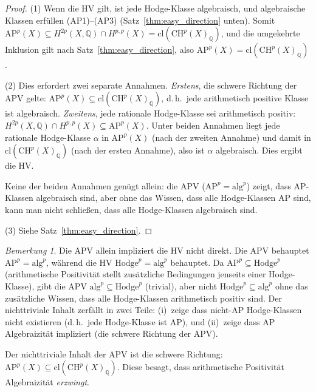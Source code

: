 \documentclass[aps,prd,twocolumn,superscriptaddress,nofootinbib]{revtex4-2}
\theoremstyle{definition}
\theoremstyle{remark}
\newtheorem{remark}[theorem]{Bemerkung}
\begin{document}
\begin{proof}
(1) Wenn die HV gilt, ist jede Hodge-Klasse algebraisch, und algebraische Klassen erfüllen (AP1)--(AP3) (Satz~\ref{thm:easy_direction} unten). Somit $\mathrm{AP}^p(X) \subseteq H^{2p}(X, \mathbb{Q}) \cap H^{p,p}(X) = \mathrm{cl}(\mathrm{CH}^p(X)_\mathbb{Q})$, und die umgekehrte Inklusion gilt nach Satz~\ref{thm:easy_direction}, also $\mathrm{AP}^p(X) = \mathrm{cl}(\mathrm{CH}^p(X)_\mathbb{Q})$.

(2) Dies erfordert zwei separate Annahmen. \textit{Erstens}, die schwere Richtung der APV gelte: $\mathrm{AP}^p(X) \subseteq \mathrm{cl}(\mathrm{CH}^p(X)_\mathbb{Q})$, d.\,h.\ jede arithmetisch positive Klasse ist algebraisch. \textit{Zweitens}, jede rationale Hodge-Klasse sei arithmetisch positiv: $H^{2p}(X, \mathbb{Q}) \cap H^{p,p}(X) \subseteq \mathrm{AP}^p(X)$. Unter beiden Annahmen liegt jede rationale Hodge-Klasse $\alpha$ in $\mathrm{AP}^p(X)$ (nach der zweiten Annahme) und damit in $\mathrm{cl}(\mathrm{CH}^p(X)_\mathbb{Q})$ (nach der ersten Annahme), also ist $\alpha$ algebraisch. Dies ergibt die HV.

Keine der beiden Annahmen genügt allein: die APV ($\mathrm{AP}^p = \mathrm{alg}^p$) zeigt, dass AP-Klassen algebraisch sind, aber ohne das Wissen, dass alle Hodge-Klassen AP sind, kann man nicht schließen, dass alle Hodge-Klassen algebraisch sind.

(3) Siehe Satz~\ref{thm:easy_direction}.
\end{proof}

\begin{remark}
Die APV allein impliziert die HV nicht direkt. Die APV behauptet $\mathrm{AP}^p = \mathrm{alg}^p$, während die HV $\mathrm{Hodge}^p = \mathrm{alg}^p$ behauptet. Da $\mathrm{AP}^p \subseteq \mathrm{Hodge}^p$ (arithmetische Positivität stellt zusätzliche Bedingungen jenseits einer Hodge-Klasse), gibt die APV $\mathrm{alg}^p \subseteq \mathrm{Hodge}^p$ (trivial), aber nicht $\mathrm{Hodge}^p \subseteq \mathrm{alg}^p$ ohne das zusätzliche Wissen, dass alle Hodge-Klassen arithmetisch positiv sind. Der nichttriviale Inhalt zerfällt in zwei Teile: (i)~zeige dass nicht-AP Hodge-Klassen nicht existieren (d.\,h.\ jede Hodge-Klasse ist AP), und (ii)~zeige dass AP Algebraizität impliziert (die schwere Richtung der APV).
\end{remark}

Der nichttriviale Inhalt der APV ist die \glqq schwere Richtung\grqq{}: $\mathrm{AP}^p(X) \subseteq \mathrm{cl}(\mathrm{CH}^p(X)_\mathbb{Q})$. Diese besagt, dass arithmetische Positivität Algebraizität \textit{erzwingt}.
\end{document}
